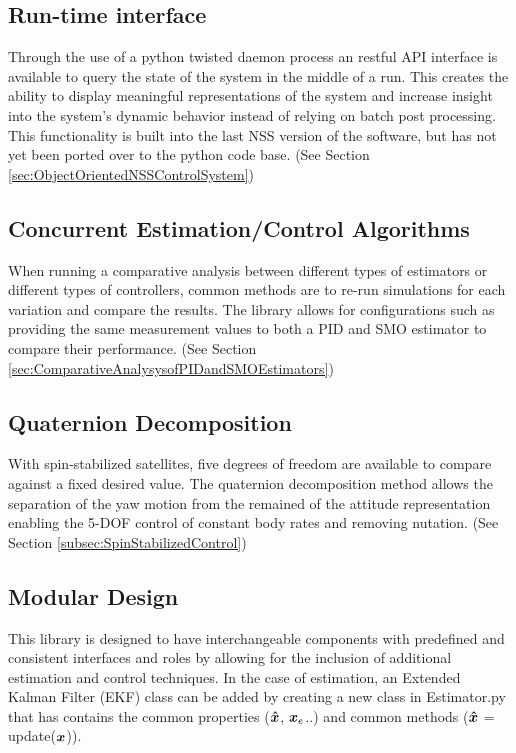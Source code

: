 \subsection{Run-time interface}

Through the use of a python twisted daemon process an restful API interface is available to query the state of the system in the middle of a run. This creates the ability to display meaningful representations of the system and increase insight into the system's dynamic behavior instead of relying on batch post processing.  This functionality is built into the last NSS version of the software, but has not yet been ported over to the python code base. (See Section \ref{sec:ObjectOrientedNSSControlSystem})

\subsection{Concurrent Estimation/Control Algorithms}

When running a comparative analysis between different types of estimators or different types of controllers, common methods are to re-run simulations for each variation and compare the results. The library allows for configurations such as providing the same measurement values to both a PID and SMO estimator to compare their performance. (See Section \ref{sec:ComparativeAnalysysofPIDandSMOEstimators})

\subsection{Quaternion Decomposition}

With spin-stabilized satellites, five degrees of freedom are available to compare against a fixed desired value.  The quaternion decomposition method allows the separation of the yaw motion from the remained of the attitude representation enabling the 5-DOF control of constant body rates and removing nutation. (See Section \ref{subsec:SpinStabilizedControl})

\subsection{Modular Design}

This library is designed to have interchangeable components with predefined and consistent interfaces and roles by allowing for the inclusion of additional estimation and control techniques. In the case of estimation, an Extended Kalman Filter (EKF) class can be added by creating a new class in Estimator.py that has contains the common properties ($\boldsymbol{\hat{x}}$, $\boldsymbol{x}_e$..) and common methods ($\boldsymbol{\hat{x}}$ = update($\boldsymbol{x}$)).

